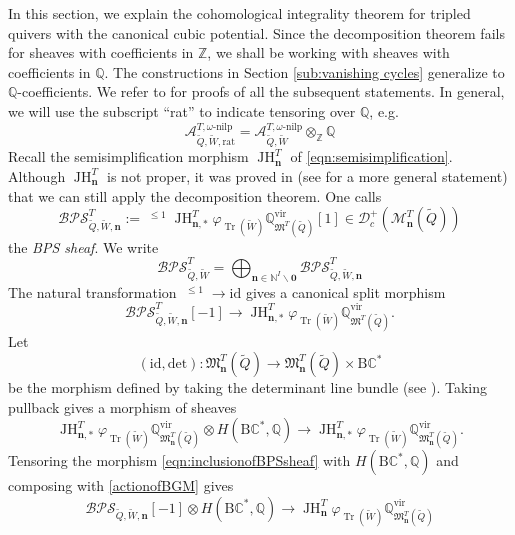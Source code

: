 \documentclass{amsart}
\def\BQ{{\mathbb{Q}}}
\def\BZ{{\mathbb{Z}}}
\DeclareMathOperator{\Tr}{\mathrm{Tr}}
\def\vir{\mathrm{vir}}
\DeclareMathOperator{\ptau}{{}^{\mathfrak{p}}\tau}
\DeclareMathOperator{\JH}{\mathrm{JH}}
\def\nn{{\mathbb{N}^I}}
\def\bn{{\boldsymbol{n}}}
\def\b0{{\boldsymbol{0}}}
\def\tQ{\tilde{Q}}
\def\tW{\tilde{W}}
\def\kha{\mathcal{A}^{T,\omega\text{-nilp}}_{\tQ,\tW}}
\def\kharat{\mathcal{A}^{T,\omega\text{-nilp}}_{\tQ,\tW,\text{rat}}}
\begin{document}
In this section, we explain the cohomological integrality theorem for tripled quivers with the canonical cubic potential. Since the decomposition theorem fails for sheaves with coefficients in $\mathbb{Z}$, we shall be working with sheaves with coefficients in $\mathbb{Q}$. The constructions in Section \ref{sub:vanishing cycles} generalize to $\mathbb{Q}$-coefficients. We refer to \cite{davison2020cohomological} for proofs of all the subsequent statements. In general, we will use the subscript ``rat'' to indicate tensoring over $\BQ$, e.g.
$$
\kharat = \kha \otimes_{\BZ} \BQ
$$
Recall the semisimplification morphism $\JH^T_{\bn}$ of \eqref{eqn:semisimplification}. Although $\JH^T_{\bn}$ is not proper, it was proved in \cite[Lemma 4.1]{davison2020cohomological} (see \cite{kinjo2024decompositiontheoremgoodmoduli} for a more general statement) that we can still apply the decomposition theorem.
One calls 
\[ 
\mathcal{BPS}_{\tilde{Q},\tilde{W},\bn}^T :=\ptau^{\leq 1}\JH^T_{\bn,*} \varphi_{\Tr(\tilde{W})} \mathbb{Q}^{\vir}_{\mathfrak{M}^T(\tilde{Q})}[1]  \in \mathcal{D}^+_c(\mathcal{M}^T_{\bn}(\tilde{Q}))
\]
the \emph{BPS sheaf}. We write
$$
\mathcal{BPS}_{\tilde{Q},\tilde{W}}^T  = \bigoplus_{\bn \in \nn \backslash \b0} \mathcal{BPS}_{\tilde{Q},\tilde{W},\bn}^T 
$$
The natural transformation $\ptau^{\leq 1} \rightarrow \mathrm{id}$ gives a canonical split morphism 
\begin{equation} 
\label{eqn:inclusionofBPSsheaf}
\mathcal{BPS}^T_{\tilde{Q},\tilde{W},\bn}[-1] \rightarrow  \JH^T_{\bn,*} \varphi_{\Tr(\tilde{W})} \mathbb{Q}^{\vir}_{\mathfrak{M}^T(\tilde{Q})}.
\end{equation}
Let \begin{equation}
(\mathrm{id},\mathrm{det}): \mathfrak{M}^T_{\bn}(\tilde{Q}) \rightarrow \mathfrak{M}^T_{\bn}(\tilde{Q}) \times \mathrm{B}\mathbb{C}^*
\end{equation} be the morphism defined by taking the determinant line bundle (see \cite[Section 3.4]{DW}). Taking pullback gives a morphism of sheaves
\begin{equation} \label{actionofBGM}
\JH^T_{\bn,*} \varphi_{\Tr(\tilde{W})} \mathbb{Q}^{\vir}_{\mathfrak{M}^T_{\bn}(\tilde{Q})} \otimes H(\mathrm{B}\mathbb{C}^*,\mathbb{Q}) \rightarrow \JH^T_{\bn,*} \varphi_{\Tr(\tilde{W})} \mathbb{Q}^{\vir}_{\mathfrak{M}^T_{\bn}(\tilde{Q})}.   
\end{equation}
Tensoring the morphism \eqref{eqn:inclusionofBPSsheaf} with $H(\mathrm{B}\mathbb{C}^*,\mathbb{Q})$ and composing with \eqref{actionofBGM} gives 
\begin{equation} 
\label{eqn:inclusionofBPSusheaf}
\mathcal{BPS}_{\tilde{Q},\tilde{W},\bn}[-1] \otimes H(\mathrm{B}\mathbb{C}^*,\mathbb{Q}) \rightarrow  \JH^T_{\bn} \varphi_{\Tr(\tilde{W})} \mathbb{Q}^{\vir}_{\mathfrak{M}^T_{\bn}(\tilde{Q})} 
\end{equation} 
\end{document}
